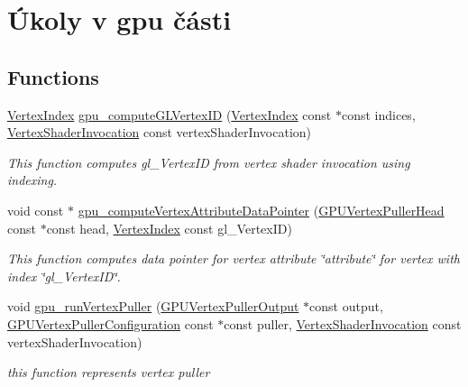 \hypertarget{group__gpu__side}{}\section{Úkoly v gpu části}
\label{group__gpu__side}
\subsection*{Functions}
\begin{DoxyCompactItemize}
\item 
\hyperlink{fwd_8h_a83b6b93a31d7fa3fc22f37a3a0798858}{Vertex\+Index} \hyperlink{group__gpu__side_ga3983ddd2c559c1a6d1e1f1f37be3eae0}{gpu\+\_\+compute\+G\+L\+Vertex\+ID} (\hyperlink{fwd_8h_a83b6b93a31d7fa3fc22f37a3a0798858}{Vertex\+Index} const $\ast$const indices, \hyperlink{fwd_8h_a3a23f024b4270ea7139910001f477346}{Vertex\+Shader\+Invocation} const vertex\+Shader\+Invocation)
\begin{DoxyCompactList}\small\item\em This function computes gl\+\_\+\+Vertex\+ID from vertex shader invocation using indexing. \end{DoxyCompactList}\item 
void const $\ast$ \hyperlink{group__gpu__side_ga4b894f26ed3c06346da10fc6c41f90eb}{gpu\+\_\+compute\+Vertex\+Attribute\+Data\+Pointer} (\hyperlink{structGPUVertexPullerHead}{G\+P\+U\+Vertex\+Puller\+Head} const $\ast$const head, \hyperlink{fwd_8h_a83b6b93a31d7fa3fc22f37a3a0798858}{Vertex\+Index} const gl\+\_\+\+Vertex\+ID)
\begin{DoxyCompactList}\small\item\em This function computes data pointer for vertex attribute \char`\"{}attribute\char`\"{} for vertex with index \char`\"{}gl\+\_\+\+Vertex\+I\+D\char`\"{}. \end{DoxyCompactList}\item 
void \hyperlink{group__gpu__side_ga0e0c36548db12eea1e6d512b9f855a1c}{gpu\+\_\+run\+Vertex\+Puller} (\hyperlink{structGPUVertexPullerOutput}{G\+P\+U\+Vertex\+Puller\+Output} $\ast$const output, \hyperlink{structGPUVertexPullerConfiguration}{G\+P\+U\+Vertex\+Puller\+Configuration} const $\ast$const puller, \hyperlink{fwd_8h_a3a23f024b4270ea7139910001f477346}{Vertex\+Shader\+Invocation} const vertex\+Shader\+Invocation)
\begin{DoxyCompactList}\small\item\em this function represents vertex puller \end{DoxyCompactList}\item 

\end{DoxyCompactItemize}
